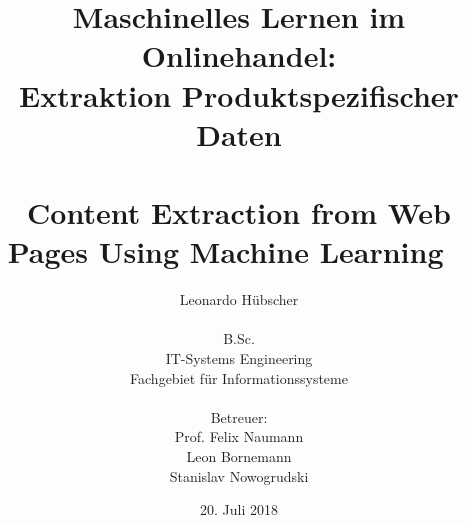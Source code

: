 \titlehead{
\vspace*{2cm}
\centering \texttt{[image: resources/hpi\_logo.eps]}
}
\subject{Bachelorarbeit}
\title{
Maschinelles Lernen im Onlinehandel: \\
Extraktion Produktspezifischer Daten \\
\bigskip ~\\
\large{Content Extraction from Web Pages Using Machine Learning}
\medskip ~\\
}
\author{
Leonardo Hübscher\\
\\B.Sc.\\
IT-Systems Engineering\\
Fachgebiet für Informationssysteme \\
\bigskip ~\\
Betreuer:\\
Prof. Felix Naumann\\
Leon Bornemann\\
Stanislav Nowogrudski
}
\date{20. Juli 2018}